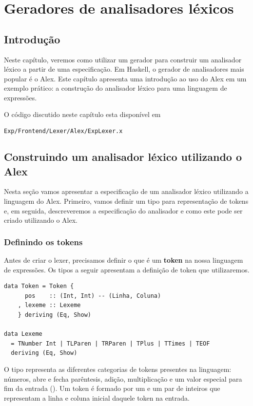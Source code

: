 \chapter{Geradores de analisadores léxicos}

\section{Introdução}

Neste capítulo, veremos como utilizar um gerador para construir um
analisador léxico a partir de uma especificação. Em Haskell, o
gerador de analisadores mais popular é o Alex. Este capítulo
apresenta uma introdução ao uso do Alex em um exemplo prático: a
construção do analisador léxico para uma linguagem de expressões.

O código discutido neste capítulo esta disponível em
\begin{center}
  \verb|Exp/Frontend/Lexer/Alex/ExpLexer.x|
\end{center}

\section{Construindo um analisador léxico utilizando o Alex}

Nesta seção vamos apresentar a especificação de um analisador léxico
utilizando a linguagem do Alex. Primeiro, vamos definir um tipo para
representação de tokens e, em seguida, descreveremos a especificação
do analisador e como este pode ser criado utilizando o Alex.

\subsection{Definindo os tokens}

Antes de criar o lexer, precisamos definir o que é um \textbf{token}
na nossa linguagem de expressões. Os tipos a seguir apresentam a
definição de token que utilizaremos.

\begin{verbatim}
data Token = Token {
      pos    :: (Int, Int) -- (Linha, Coluna)
    , lexeme :: Lexeme
    } deriving (Eq, Show)

data Lexeme
  = TNumber Int | TLParen | TRParen | TPlus | TTimes | TEOF
  deriving (Eq, Show)
\end{verbatim}

O tipo  representa as diferentes
categorias de tokens presentes na linguagem: números, abre e fecha
parêntesis, adição, multiplicação e um valor especial para fim da
entrada (). Um token é formado por um
 e um par de inteiros que representam
a linha e coluna inicial daquele token na entrada.

